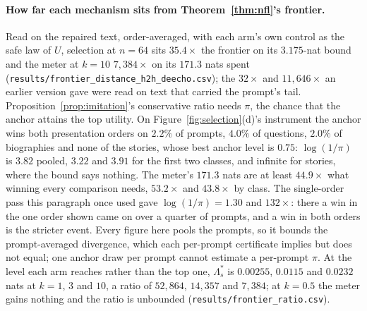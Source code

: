 \paragraph{How far each mechanism sits from Theorem~\ref{thm:nfl}'s frontier.}\label{app:frontierratio}
Read on the repaired text, order-averaged, with each arm's own control as the safe law of $U$, selection at
$n=64$ sits $35.4\times$ the frontier on its $3.175$-nat bound and the meter at $k=10$ $7{,}384\times$ on its
$171.3$ nats spent (\texttt{results/\allowbreak frontier\_\allowbreak distance\_\allowbreak h2h\_\allowbreak deecho.csv});
the $32\times$ and $11{,}646\times$ an earlier version gave were read on text that carried the prompt's tail.
Proposition~\ref{prop:imitation}'s conservative ratio needs $\pi$, the chance that the anchor attains the
top utility. On Figure~\ref{fig:selection}(d)'s instrument the anchor wins both presentation orders on
$2.2\%$ of prompts, $4.0\%$ of questions, $2.0\%$ of biographies and none of the stories, whose best anchor
level is $0.75$: $\log(1/\pi)$ is $3.82$ pooled, $3.22$ and $3.91$ for the first two classes, and infinite for
stories, where the bound says nothing. The meter's $171.3$ nats are at least $44.9\times$ what winning every
comparison needs, $53.2\times$ and $43.8\times$ by class. The single-order pass this paragraph once used
gave $\log(1/\pi) = 1.30$ and $132\times$: there a win in the one order shown came on over a quarter of
prompts, and a win in both orders is the stricter event. Every figure here pools the prompts, so it bounds the prompt-averaged
divergence, which each per-prompt certificate implies but does not equal; one anchor draw per prompt
cannot estimate a per-prompt $\pi$. At the level each arm reaches rather than the top one,
$\Lambda^*_s$ is $0.00255$, $0.0115$ and $0.0232$ nats at $k=1$, $3$ and $10$, a ratio of $52{,}864$,
$14{,}357$ and $7{,}384$; at $k=0.5$ the meter gains nothing and the ratio is unbounded
(\texttt{results/\allowbreak frontier\_\allowbreak ratio.csv}).


